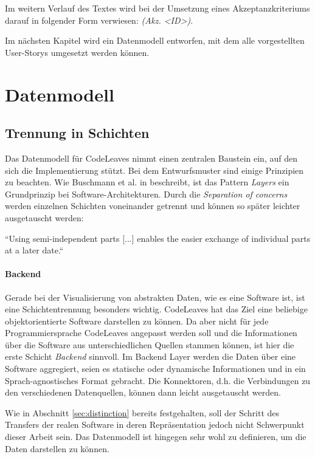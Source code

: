 Im weitern Verlauf des Textes wird bei der Umsetzung eines Akzeptanzkriteriums darauf in folgender Form verwiesen: \textit{(Akz. <ID>)}.

Im nächsten Kapitel wird ein Datenmodell entworfen, mit dem alle vorgestellten User-Storys umgesetzt werden können.

\chapter{Datenmodell}
\label{ch:data-model}
\section{Trennung in Schichten}
\label{ch:data-layers}

Das Datenmodell für CodeLeaves nimmt einen zentralen Baustein ein, auf den sich die Implementierung stützt. Bei dem Entwurfsmuster sind einige Prinzipien zu beachten. Wie Buschmann et al. in \cite{frank2007pattern} beschreibt, ist das Pattern \textit{Layers} ein Grundprinzip bei Software-Architekturen. Durch die \textit{Separation of concerns} werden einzelnen Schichten voneinander getrennt und können so später leichter ausgetauscht werden:

``Using semi-independent parts [...] enables the easier exchange of individual parts at a later date.`` \cite{frank2007pattern}

\subsubsection*{Backend}
Gerade bei der Visualisierung von abstrakten Daten, wie es eine Software ist, ist eine Schichtentrennung besonders wichtig. CodeLeaves hat das Ziel eine beliebige objektorientierte Software darstellen zu können. Da aber nicht für jede Programmiersprache CodeLeaves angepasst werden soll und die Informationen über die Software aus unterschiedlichen Quellen stammen können, ist hier die erste Schicht \textit{Backend} sinnvoll. Im Backend Layer werden die Daten über eine Software aggregiert, seien es statische oder dynamische Informationen und in ein Sprach-agnostisches Format gebracht. Die Konnektoren, d.h. die Verbindungen zu den verschiedenen Datenquellen, können dann leicht ausgetauscht werden.

Wie in Abschnitt \ref{sec:distinction} bereits festgehalten, soll der Schritt des Transfers der realen Software in deren Repräsentation jedoch nicht Schwerpunkt dieser Arbeit sein. Das Datenmodell ist hingegen sehr wohl zu definieren, um die Daten darstellen zu können.

